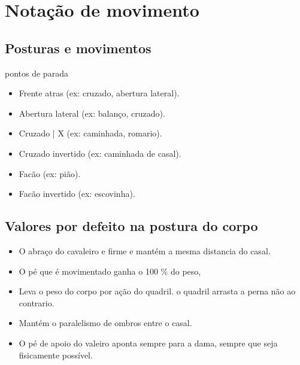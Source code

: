

\chapter{Notação de movimento}


\section{Posturas e movimentos}

pontos de parada
\begin{itemize}
\item Frente atras (ex: cruzado, abertura lateral).
\item Abertura lateral (ex: balanço, cruzado).
\item Cruzado | X (ex: caminhada, romario).
\item Cruzado invertido (ex: caminhada de casal).
\item Facão (ex: pião).
\item Facão invertido (ex: escovinha).
\end{itemize}


\section{Valores por defeito na postura do corpo}


\begin{itemize}
\item O abraço do cavaleiro e firme e mantém a mesma distancia do casal.
\item O pé que é movimentado ganha o 100 $\%$ do peso,
\item Leva o peso do corpo por ação do quadril. o quadril arrasta a perna não ao contrario.
\item Mantém o paralelismo de ombros entre o casal.
\item O pé de apoio do valeiro aponta sempre para a dama, sempre que seja fisicamente possível.
\end{itemize}


